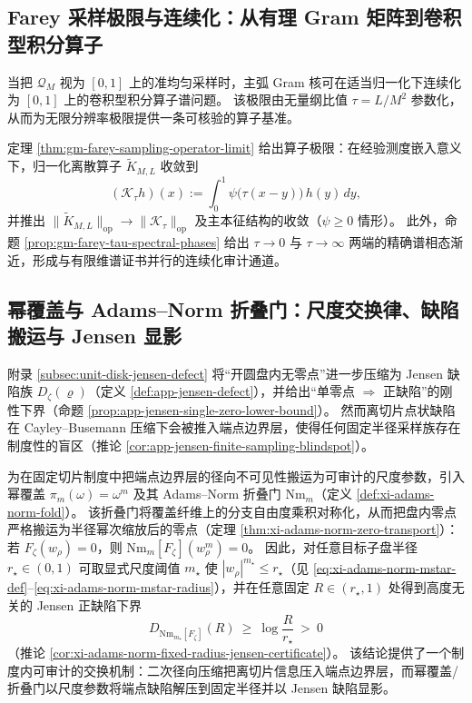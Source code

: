 \subsection{Farey 采样极限与连续化：从有理 Gram 矩阵到卷积型积分算子}\label{subsec:cdim-farey-operator-limit}
当把 \(\mathcal{Q}_M\) 视为 \([0,1]\) 上的准均匀采样时，主弧 Gram 核可在适当归一化下连续化为 \([0,1]\) 上的卷积型积分算子谱问题。
该极限由无量纲比值 \(\tau=L/M^2\) 参数化，从而为无限分辨率极限提供一条可核验的算子基准。
\par
定理 \ref{thm:gm-farey-sampling-operator-limit} 给出算子极限：在经验测度嵌入意义下，归一化离散算子 \(\widetilde K_{M,L}\) 收敛到
\[
(\mathcal{K}_\tau h)(x):=\int_0^1 \psi\!\bigl(\tau(x-y)\bigr)\,h(y)\,dy,
\]
并推出 \(\|\widetilde K_{M,L}\|_{\mathrm{op}}\to\|\mathcal{K}_\tau\|_{\mathrm{op}}\) 及主本征结构的收敛（\(\psi\ge 0\) 情形）。
此外，命题 \ref{prop:gm-farey-tau-spectral-phases} 给出 \(\tau\to 0\) 与 \(\tau\to\infty\) 两端的精确谱相态渐近，形成与有限维谱证书并行的连续化审计通道。

\subsection{幂覆盖与 Adams--Norm 折叠门：尺度交换律、缺陷搬运与 Jensen 显影}\label{subsec:cdim-adams-norm-folding-jensen}
附录 \ref{subsec:unit-disk-jensen-defect} 将“开圆盘内无零点”进一步压缩为 Jensen 缺陷族 \(D_{\zeta}(\varrho)\)（定义 \ref{def:app-jensen-defect}），并给出“单零点 \(\Rightarrow\) 正缺陷”的刚性下界（命题 \ref{prop:app-jensen-single-zero-lower-bound}）。
然而离切片点状缺陷在 Cayley--Busemann 压缩下会被推入端点边界层，使得任何固定半径采样族存在制度性的盲区（推论 \ref{cor:app-jensen-finite-sampling-blindspot}）。

为在固定切片制度中把端点边界层的径向不可见性搬运为可审计的尺度参数，引入幂覆盖 \(\pi_m(\omega)=\omega^m\) 及其 Adams--Norm 折叠门 \(\mathrm{Nm}_m\)（定义 \ref{def:xi-adams-norm-fold}）。
该折叠门将覆盖纤维上的分支自由度乘积对称化，从而把盘内零点严格搬运为半径幂次缩放后的零点（定理 \ref{thm:xi-adams-norm-zero-transport}）：若 \(F_\zeta(w_\rho)=0\)，则 \(\mathrm{Nm}_m[F_\zeta](w_\rho^m)=0\)。
因此，对任意目标子盘半径 \(r_\star\in(0,1)\) 可取显式尺度阈值 \(m_\star\) 使 \(|w_\rho|^{m_\star}\le r_\star\)（见 \eqref{eq:xi-adams-norm-mstar-def}--\eqref{eq:xi-adams-norm-mstar-radius}），并在任意固定 \(R\in(r_\star,1)\) 处得到高度无关的 Jensen 正缺陷下界
\[
D_{\mathrm{Nm}_{m_\star}[F_\zeta]}(R)\ \ge\ \log\!\frac{R}{r_\star}\ >\ 0
\]
（推论 \ref{cor:xi-adams-norm-fixed-radius-jensen-certificate}）。
该结论提供了一个制度内可审计的交换机制：二次径向压缩把离切片信息压入端点边界层，而幂覆盖/折叠门以尺度参数将端点缺陷解压到固定半径并以 Jensen 缺陷显影。

